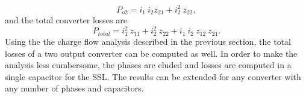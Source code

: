 \begin{equation}
 P_{o2} = i_1 ~ i_2 z_{21} + i_2^2 ~ z_{22},
 \label{eq:ploss_2}
\end{equation}
and the total converter losses are
\begin{equation}
 P_{total} = i_1^2 ~ z_{11} + i_2^2 ~ z_{22} +  i_1 ~ i_2 ~ z_{12} ~ z_{21}  .
 \label{eq:ploss_3}
\end{equation}
Using the the charge flow analysis  described in the previous section, the total losses of a two output converter can be computed as well. In order to make the analysis less cumbersome, the phases are eluded and losses are computed in a single capacitor for the SSL. The results can be extended for any converter with any number of phases and capacitors.

